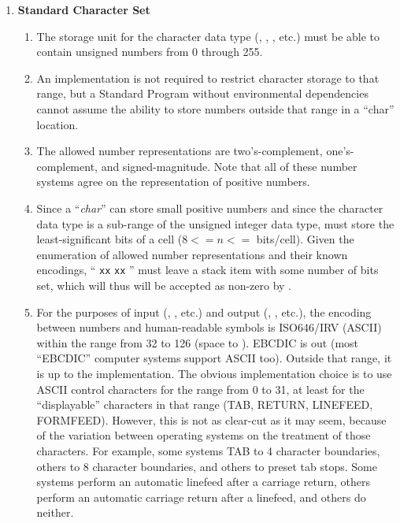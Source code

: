 \begin{enumerate}
\item \textbf{Standard Character Set}

	\begin{enumerate}
	\item The storage unit for the character data type
		(, , , etc.)
		must be able to contain unsigned numbers from 0 through 255.

	\item An implementation is not required to restrict character
		storage to that range, but a Standard Program without
		environmental dependencies cannot assume the ability to
		store numbers outside that range in a ``char'' location.

	\item The allowed number representations are two's-complement,
		one's-complement, and signed-magnitude. Note that all of
		these number systems agree on the representation of positive
		numbers.

	\item Since a ``\emph{char}'' can store small positive numbers
		and since the character data type is a sub-range of the
		unsigned integer data type,  must store the 
		least-significant bits of a cell ($8 <= n <=$ bits/cell).
		Given the enumeration of allowed number representations and
		their known encodings, `` \texttt{xx} 
		\texttt{xx} '' must leave a stack item with some
		number of bits set, which will thus will be accepted as
		non-zero by .

	\item For the purposes of input (, , etc.)
		and output (, , etc.), the encoding
		between numbers and human-readable symbols is ISO646/IRV
		(ASCII) within the range from 32 to 126 (space to \tilde).
		EBCDIC is out (most ``EBCDIC'' computer systems support ASCII
		too). Outside that range, it is up to the implementation. The
		obvious implementation choice is to use ASCII control
		characters for the range from 0 to 31, at least for the
		``displayable'' characters in that range (TAB, RETURN, LINEFEED,
		FORMFEED). However, this is not as clear-cut as it may seem,
		because of the variation between operating systems on the
		treatment of those characters. For example, some systems TAB
		to 4 character boundaries, others to 8 character boundaries,
		and others to preset tab stops. Some systems perform an automatic
		linefeed after a carriage return, others perform an automatic
		carriage return after a linefeed, and others do neither.


\end{enumerate}
\end{enumerate}
